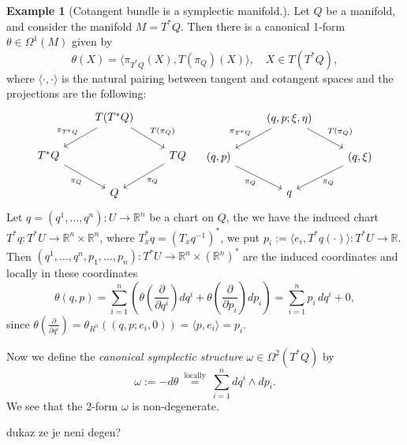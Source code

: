 \documentclass{article}
\theoremstyle{definition}
\newtheorem{example}[theorem]{Example}
\begin{document}
\begin{example}[Cotangent bundle is a symplectic manifold.]
    Let $Q$ be a manifold, and consider the manifold $M = T^*Q$. Then there is a canonical 1-form $\theta \in \Omega^1(M)$ given by 
    \begin{equation}
        \theta(X) =  \langle \pi_{T^*Q}(X) , T(\pi_Q)(X) \rangle , \quad X \in T(T^*Q),
    \end{equation}
    where $\langle \cdot , \cdot \rangle$ is the natural pairing between tangent and cotangent spaces and the projections are the following:
    \[
    \begin{tikzcd}
        & T(T^*Q) \arrow[ld, "\pi_{T^*Q}"'] \arrow[rd, "T(\pi_Q)"] & \\
        T^*Q \arrow[rd, "\pi_Q"'] & & TQ \arrow[ld, "\pi_Q"] \\
        & Q &
        \end{tikzcd}
        \quad
        \begin{tikzcd}
        & (q, p; \xi, \eta) \arrow[ld, "\pi_{T^*Q}"'] \arrow[rd, "T(\pi_Q)"] & \\
        (q, p) \arrow[rd, "\pi_Q"'] & & (q, \xi) \arrow[ld, "\pi_Q"] \\
        & q &
    \end{tikzcd}
    \]    
    Let $ q = (q^1, \ldots, q^n) : U \to \mathbb{R}^n$ be a chart on $Q$, the we have the induced chart $T^*q : T^*U \to \mathbb{R}^n \times \mathbb{R}^n$, where $T^*_x q = (T_x q^{-1})^*$, we put $p_i := \langle e_i , T^*q(\cdot) \rangle : T^*U \to \mathbb{R}$. Then $(q^1, \ldots, q^n, p_1, \ldots, p_n) : T^*U \to \mathbb{R}^n \times (\mathbb{R}^n)^*$ are the induced coordinates and locally in these coordinates 
    \begin{equation}
        \theta(q,p) = \sum_{i=1}^n \left( \theta \left( \frac{\partial}{\partial q^i} \right) dq^i + \theta \left( \frac{\partial}{\partial p_i} \right) dp_i \right) = \sum_{i=1}^n p_i \, dq^i + 0,
    \end{equation}
    since $\theta \left( \frac{\partial}{\partial q^i} \right) = \theta_{R^n} \left( (q,p;e_i,0) \right) = \langle p,e_i \rangle = p_i$.

    Now we define the \textit{canonical symplectic structure} $\omega \in \Omega^2(T^*Q)$ by 
    \begin{equation}
        \omega := -d \theta \stackrel{\text { locally }}{=} \sum_{i=1}^n d q^i \wedge d p_i.
    \end{equation}
    We see that the 2-form $\omega$ is non-degenerate.
\end{example}
dukaz ze je neni degen?
\end{document}
